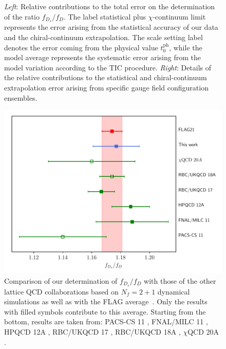 \begin{figure}
\begin{center}
\begin{minipage}{.37\linewidth}
\end{minipage}
\end{center}
\vspace{-5mm}
	\caption{\textit{Left}: Relative contributions to the total error on the determination of the ratio $f_{D_s}/f_D$. The label statistical plus $\chi$-continuum limit represents the error arising from the statistical accuracy of our data and the chiral-continuum extrapolation. The scale setting label denotes the error coming from the physical value $t_0^{\mathrm{ph}}$, while the model average represents the systematic error arising from the model variation according to the TIC procedure. \textit{Right}: Details of the relative contributions to the statistical and chiral-continuum extrapolation error arising from specific gauge field configuration ensembles. 
          }
	    \label{fig:fds_ratio_error}
\end{figure}

\begin{figure}
	\centering
	\includegraphics[scale=0.7]{./cap6/figs/fds/ratio_fds_comparison.pdf}
	\caption{Comparison of our determination of $f_{D_s}/f_D$ with those of the other lattice QCD collaborations based on $N_f=2+1$ dynamical simulations as well as with the FLAG average~\cite{FlavourLatticeAveragingGroupFLAG:2021npn}. Only the results with filled symbols contribute to this average. Starting from the bottom, results are taken from:  PACS-CS 11 \cite{PACS-CS:2011ngu}, FNAL/MILC 11  \cite{FermilabLattice:2011njy}, HPQCD 12A \cite{Na:2012iu},  RBC/UKQCD 17 \cite{Boyle:2017jwu}, RBC/UKQCD 18A \cite{Boyle:2018knm},  $\chi$QCD 20A \cite{Chen:2020qma}. }
	\label{fig:fds_over_fd_comparison}
\end{figure}





